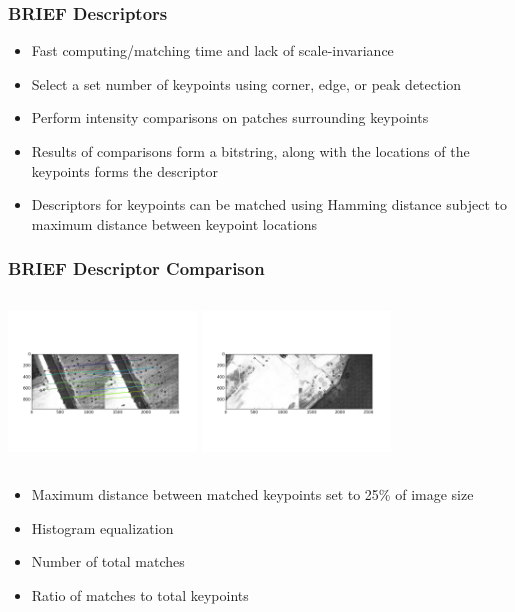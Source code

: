 \documentclass{beamer}
\begin{document}
\begin{frame}
\frametitle{BRIEF Descriptors}
\begin{itemize}
  \item Fast computing/matching time and lack of scale-invariance
  \item Select a set number of keypoints using corner, edge, or peak detection
  \item Perform intensity comparisons on patches surrounding keypoints
  \item Results of comparisons form a bitstring, along with the locations of the keypoints forms the descriptor
  \item Descriptors for keypoints can be matched using Hamming distance subject to maximum distance between keypoint locations
\end{itemize}
\end{frame}

\begin{frame}
\frametitle{BRIEF Descriptor Comparison}
\begin{columns}
    \includegraphics[width = 5cm]{Figures/briefmatchgood}
    \includegraphics[width = 5cm]{Figures/briefmatchbad}
\end{columns}
  \begin{itemize}
    \item Maximum distance between matched keypoints set to 25\% of image size
    \item Histogram equalization
    \item Number of total matches
    \item Ratio of matches to total keypoints
  \end{itemize}
\end{frame}
\end{document}

